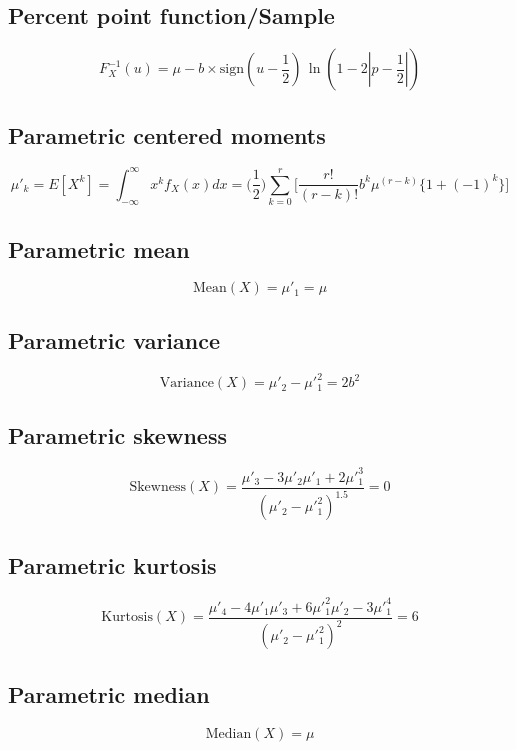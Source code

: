 \documentclass{article}
\begin{document}
\subsection{Percent point function/Sample}
\begin{equation*} F^{-1}_{X}\left(u\right)=\mu-b\times \mathrm{sign}\left(u-\frac{1}{2}\right)\,\ln\left(1-2\left|p-\frac{1}{2}\right|\right) \end{equation*}
\subsection{Parametric centered moments}
\begin{equation*} \mu'_{k}=E[X^k]=\int_{-\infty}^{\infty}x^{k}f_{X}\left(x\right)dx=\bigg({\frac{1}{2}}\bigg) \sum_{k=0}^r \bigg[{\frac{r!}{(r-k)!}} b^k \mu^{(r-k)} \{1+(-1)^k\}\bigg] \end{equation*}
\subsection{Parametric mean}
\begin{equation*} \mathrm{Mean}(X)=\mu'_{1}=\mu \end{equation*}
\subsection{Parametric variance}
\begin{equation*} \mathrm{Variance}(X)=\mu'_{2}-\mu'^{2}_{1}=2b^2 \end{equation*}
\subsection{Parametric skewness}
\begin{equation*} \mathrm{Skewness}(X)=\frac{\mu'_{3}-3\mu'_{2}\mu'_{1}+2\mu'^{3}_{1}}{(\mu'_{2}-\mu'^{2}_{1})^{1.5}}=0 \end{equation*}
\subsection{Parametric kurtosis}
\begin{equation*} \mathrm{Kurtosis}(X)=\frac{\mu'_{4}-4\mu'_{1}\mu'_{3}+6\mu'^{2}_{1}\mu'_{2}-3\mu'^{4}_{1}}{(\mu'_{2}-\mu'^{2}_{1})^{2}}=6 \end{equation*}
\subsection{Parametric median}
\begin{equation*} \mathrm{Median}(X)=\mu \end{equation*}
\end{document}
